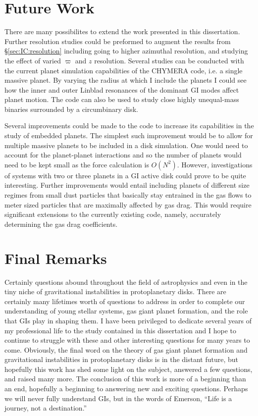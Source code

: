 \section{Future Work}

There are many possibilites to extend the work presented in this dissertation. Further resolution studies could be preformed to augment the results from \S\ref{sec:IC:resolution} including going to higher azimuthal resolution, and studying the effect of varied $\varpi$ and $z$ resolution. Several studies can be conducted with the current planet simulation capabilities of the CHYMERA code, i.e. a single massive planet. By varying the radius at which I include the planets I could see how the inner and outer Linblad resonances of the dominant GI modes affect planet motion. The code can also be used to study close highly unequal-mass binaries surrounded by a circumbinary disk. 

Several improvements could be made to the code to increase its capabilities in the study of embedded planets. The simplest such improvement would be to allow for multiple massive planets to be included in a disk simulation. One would need to account for the planet-planet interactions and so the number of planets would need to be kept small as the force calculation is $O(N^2)$. However, investigations of systems with two or three planets in a GI active disk could prove to be quite interesting. Further improvements would entail including planets of different size regimes from small dust particles that basically stay entrained in the gas flows to meter sized particles that are maximally affected by gas drag. This would require significant extensions to the currently existing code, namely, accurately determining the gas drag coefficients.

\section{Final Remarks}

Certainly questions abound throughout the field of astrophysics and even in the tiny niche of gravitational instabilities in protoplanetary disks. There are certainly many lifetimes worth of questions to address in order to complete our understanding of young stellar systems, gas giant planet formation, and the role that GIs play in shaping them. I have been privileged to dedicate several years of my professional life to the study contained in this dissertation and I hope to continue to struggle with these and other interesting questions for many years to come. Obviously, the final word on the theory of gas giant planet formation and gravitational instabilities in protoplanetary disks is in the distant future, but hopefully this work has shed some light on the subject, answered a few questions, and raised many more. The conclusion of this work is more of a beginning than an end, hopefully a beginning to answering new and exciting questions. Perhaps we will never fully understand GIs, but in the words of Emerson, ``Life is a journey, not a destination.''
